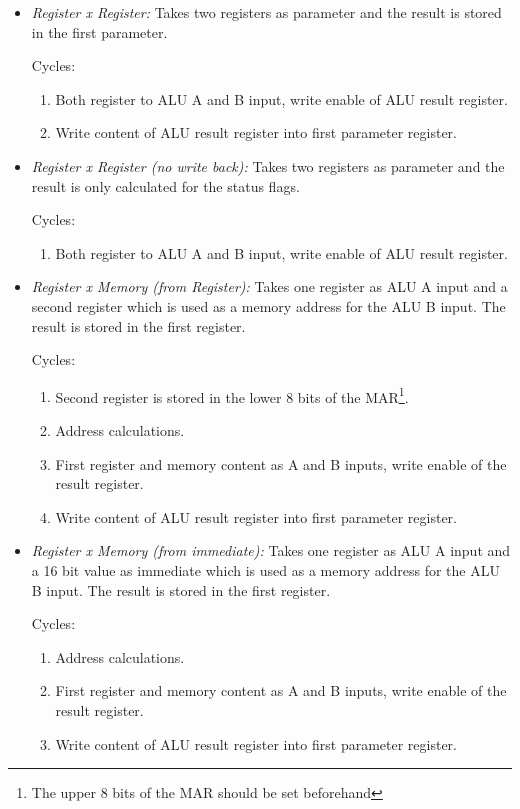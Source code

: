 \begin{itemize}
  \item \emph{Register x Register:} Takes two registers as parameter and the result is stored in the first parameter.

  Cycles:
  \begin{enumerate}
    \item Both register to \gls{ALU} A and B input, write enable of \gls{ALU} result register.
    \item Write content of \gls{ALU} result register into first parameter register.
  \end{enumerate}

  \item \emph{Register x Register (no write back):} Takes two registers as parameter and the result is only calculated for the status flags.

  Cycles:
  \begin{enumerate}
    \item Both register to \gls{ALU} A and B input, write enable of \gls{ALU} result register.
  \end{enumerate}

  \item \emph{Register x Memory (from Register):} Takes one register as \gls{ALU} A input and a second register which is used as a memory address for the \gls{ALU} B input.
  The result is stored in the first register.

  Cycles:
  \begin{enumerate}
    \item Second register is stored in the lower 8 bits of the \gls{MAR}\footnote{The upper 8 bits of the \gls{MAR} should be set beforehand}.
    \item Address calculations.
    \item First register and memory content as A and B inputs, write enable of the result register.
    \item Write content of \gls{ALU} result register into first parameter register.
  \end{enumerate}

  \item \emph{Register x Memory (from immediate):} Takes one register as \gls{ALU} A input and a 16 bit value as immediate which is used as a memory address for the \gls{ALU} B input.
  The result is stored in the first register.

  Cycles:
  \begin{enumerate}
    \item Address calculations.
    \item First register and memory content as A and B inputs, write enable of the result register.
    \item Write content of \gls{ALU} result register into first parameter register.
  \end{enumerate}


\end{itemize}
